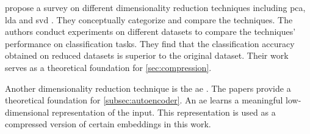 \citeauthor{dim_reduction2021} propose a survey on different dimensionality reduction techniques including \acs*{pca}, \acs*{lda} and \acs*{svd} \cite{dim_reduction2021}.
They conceptually categorize and compare the techniques.
The authors conduct experiments on different datasets to compare the techniques' performance on classification tasks.
They find that the classification accuracy obtained on reduced datasets is superior to the original dataset.
Their work serves as a theoretical foundation for \autoref{sec:compression}.

Another dimensionality reduction technique is the \acs*{ae} \cite{autoencoder202, autoencoder2021}.
The papers provide a theoretical foundation for \autoref{subsec:autoencoder}.
An \acs*{ae} learns a meaningful low-dimensional representation of the input.
This representation is used as a compressed version of certain embeddings in this work.